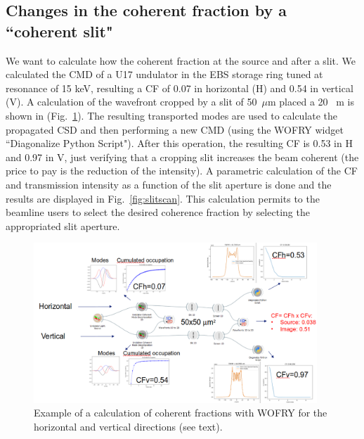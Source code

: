 \documentclass{iopconfser}
\begin{document}
\subsection{Changes in the coherent fraction by a ``coherent slit"}
We want to calculate how the coherent fraction at the source and after a slit. 
We calculated the CMD of a U17 undulator in the EBS storage ring tuned at resonance of 15 keV, resulting a CF of  0.07 in horizontal (H) and 0.54 in vertical (V).  A calculation of the wavefront cropped by a slit of 50~$\mu$m placed a 20~ m is shown in (Fig.~\ref{fig:croppingslit}). The resulting transported modes are used to calculate the propagated CSD and then performing a new CMD (using the WOFRY widget ``Diagonalize Python Script"). After this operation, the resulting CF is 0.53 in H and 0.97 in V, just verifying that a cropping slit increases the beam coherent (the price to pay is the reduction of the intensity). A parametric calculation of the CF and transmission intensity as a function of the slit aperture is done and the results are displayed in Fig.~\ref{fig:slitscan}. This calculation permits to the beamline users to select the desired coherence fraction by selecting the appropriated slit aperture. 

\begin{figure}[H]
    \centering
    \includegraphics[width=0.95\textwidth]{figures/croppingslit.png}
    \caption{Example of a calculation of coherent fractions with WOFRY for the horizontal and vertical directions (see text).}\label{fig:croppingslit}
\end{figure}
\end{document}
